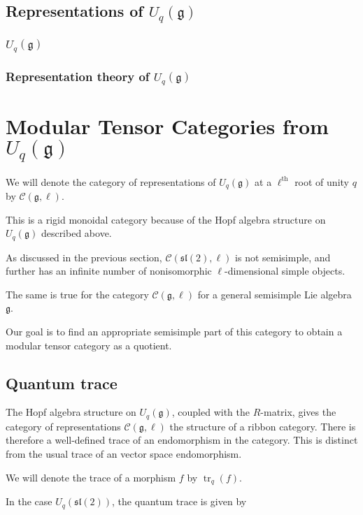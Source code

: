 \documentclass[]{article}
\newcommand{\tr}{\operatorname{tr}}
\newcommand{\sll}{\mathfrak{sl}}
\numberwithin{equation}{subsection}
\begin{document}
\subsection{Representations of $U_q(\mathfrak{g})$}
    \subsubsection{$U_q(\mathfrak{g})$}
    \subsubsection{Representation theory of $U_q(\mathfrak{g})$}


\section{Modular Tensor Categories from $U_q(\mathfrak{g})$}
We will denote the category of representations of $U_q(\mathfrak{g})$ at a
$\ell^\text{th}$ root of unity $q$ by $\mathcal{C}(\mathfrak{g}, \ell)$. 

This is a rigid monoidal category because of the Hopf algebra structure on
$U_q(\mathfrak{g})$ described above. 

As discussed in the previous section, $\mathcal{C}(\sll(2),\ell)$ is not
semisimple, and further has an infinite number of nonisomorphic
$\ell$-dimensional simple objects.  

The same is true for the category $\mathcal{C}(\mathfrak{g}, \ell)$ for a
general semisimple Lie algebra $\mathfrak{g}$.

Our goal is to find an appropriate semisimple part of this category to obtain a
modular tensor category as a quotient.




\subsection{Quantum trace}

The Hopf algebra structure on $U_q(\mathfrak{g})$, coupled with the $R$-matrix,
gives the category of representations $\mathcal{C}(\mathfrak{g}, \ell)$ the
structure of a ribbon category. There is therefore a well-defined trace of an
endomorphism in the category. This is distinct from the usual trace of an
vector space endomorphism. 

We will denote the trace of a morphism $f$ by $\tr_q(f)$.

In the case $U_q(\sll(2))$, the quantum trace is given by 
\end{document}
